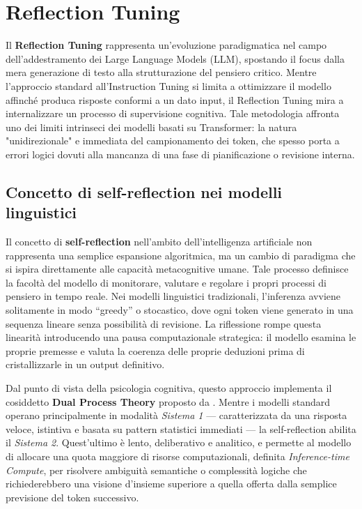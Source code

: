\section{Reflection Tuning}

Il \textbf{Reflection Tuning} \cite{ze2023reflection} rappresenta un'evoluzione paradigmatica nel campo dell'addestramento dei Large Language Models (LLM), spostando il focus dalla mera generazione di testo alla strutturazione del pensiero critico. Mentre l'approccio standard all'Instruction Tuning si limita a ottimizzare il modello affinché produca risposte conformi a un dato input, il Reflection Tuning mira a internalizzare un processo di supervisione cognitiva. Tale metodologia affronta uno dei limiti intrinseci dei modelli basati su Transformer: la natura "unidirezionale" e immediata del campionamento dei token, che spesso porta a errori logici dovuti alla mancanza di una fase di pianificazione o revisione interna.

\subsection{Concetto di self-reflection nei modelli linguistici}

Il concetto di \textbf{self-reflection} nell'ambito dell'intelligenza artificiale non rappresenta una semplice espansione algoritmica, ma un cambio di paradigma che si ispira direttamente alle capacità metacognitive umane. Tale processo definisce la facoltà del modello di monitorare, valutare e regolare i propri processi di pensiero in tempo reale. Nei modelli linguistici tradizionali, l'inferenza avviene solitamente in modo ``greedy'' o stocastico, dove ogni token viene generato in una sequenza lineare senza possibilità di revisione. La riflessione rompe questa linearità introducendo una pausa computazionale strategica: il modello esamina le proprie premesse e valuta la coerenza delle proprie deduzioni prima di cristallizzarle in un output definitivo.

Dal punto di vista della psicologia cognitiva, questo approccio implementa il cosiddetto \textbf{Dual Process Theory} proposto da \citet{kahneman2011thinking}. Mentre i modelli standard operano principalmente in modalità \textit{Sistema 1} — caratterizzata da una risposta veloce, istintiva e basata su pattern statistici immediati — la self-reflection abilita il \textit{Sistema 2}. Quest'ultimo è lento, deliberativo e analitico, e permette al modello di allocare una quota maggiore di risorse computazionali, definita \textit{Inference-time Compute}, per risolvere ambiguità semantiche o complessità logiche che richiederebbero una visione d'insieme superiore a quella offerta dalla semplice previsione del token successivo.


